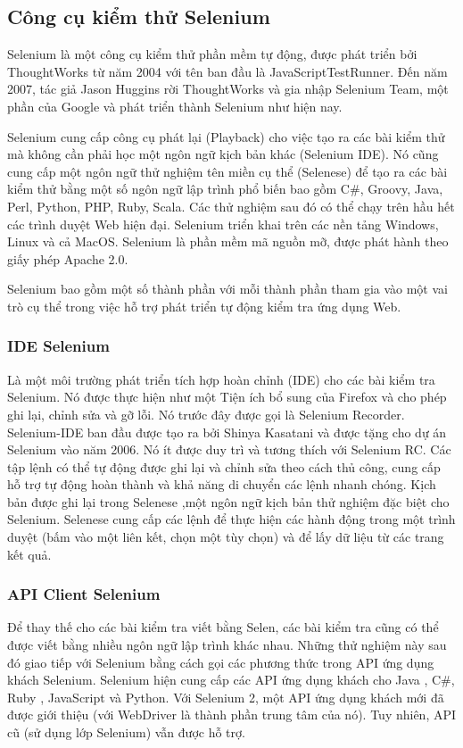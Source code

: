\subsection{Công cụ kiểm thử Selenium}
Selenium là một công cụ kiểm thử phần mềm tự động, được phát triển bởi ThoughtWorks từ năm 2004 với tên ban đầu là JavaScriptTestRunner. Đến năm 2007, tác giả Jason Huggins rời ThoughtWorks và gia nhập Selenium Team, một phần của Google và phát triển thành Selenium như hiện nay.

Selenium cung cấp công cụ phát lại (Playback) cho việc tạo ra các bài kiểm thử mà không cần phải học một ngôn ngữ kịch bản khác (Selenium IDE). Nó cũng cung cấp một ngôn ngữ thử nghiệm tên miền cụ thể (Selenese) để tạo ra các bài kiểm thử bằng một số ngôn ngữ lập trình phổ biến bao gồm C\#, Groovy, Java, Perl, Python, PHP, Ruby, Scala. Các thử nghiệm sau đó có thể chạy trên hầu hết các trình duyệt Web hiện đại. Selenium triển khai trên các nền tảng Windows, Linux và cả MacOS. Selenium là phần mềm mã nguồn mỡ, được phát hành theo giấy phép Apache 2.0.

Selenium bao gồm một số thành phần với mỗi thành phần tham gia vào một vai trò cụ thể trong việc hỗ trợ phát triển tự động kiểm tra ứng dụng Web.
\subsubsection{IDE Selenium}
Là một môi trường phát triển tích hợp hoàn chỉnh (IDE) cho các bài kiểm tra Selenium. Nó được thực hiện như một Tiện ích bổ sung của Firefox và cho phép ghi lại, chỉnh sửa và gỡ lỗi. Nó trước đây được gọi là Selenium Recorder. Selenium-IDE ban đầu được tạo ra bởi Shinya Kasatani và được tặng cho dự án Selenium vào năm 2006. Nó ít được duy trì và tương thích với Selenium RC. Các tập lệnh có thể tự động được ghi lại và chỉnh sửa theo cách thủ công, cung cấp hỗ trợ tự động hoàn thành và khả năng di chuyển các lệnh nhanh chóng. Kịch bản được ghi lại trong Selenese ,một ngôn ngữ kịch bản thử nghiệm đặc biệt cho Selenium. Selenese cung cấp các lệnh để thực hiện các hành động trong một trình duyệt (bấm vào một liên kết, chọn một tùy chọn) và để lấy dữ liệu từ các trang kết quả.
\subsubsection{API Client Selenium}
Để thay thế cho các bài kiểm tra viết bằng Selen, các bài kiểm tra cũng có thể được viết bằng nhiều ngôn ngữ lập trình khác nhau. Những thử nghiệm này sau đó giao tiếp với Selenium bằng cách gọi các phương thức trong API ứng dụng khách Selenium. Selenium hiện cung cấp các API ứng dụng khách cho Java , C\#, Ruby , JavaScript và Python. Với Selenium 2, một API ứng dụng khách mới đã được giới thiệu (với WebDriver là thành phần trung tâm của nó). Tuy nhiên, API cũ (sử dụng lớp Selenium) vẫn được hỗ trợ.
